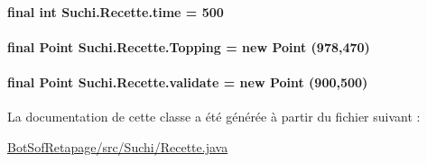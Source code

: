 \paragraph[{time}]{\setlength{\rightskip}{0pt plus 5cm}final int Suchi.\+Recette.\+time = 500\hspace{0.3cm}{\ttfamily [private]}}\label{classSuchi_1_1Recette_afcb40505dcb70462ad370a2231f74539}
\hypertarget{classSuchi_1_1Recette_a4810b2254c050209fba27757066668b3}{}
\paragraph[{Topping}]{\setlength{\rightskip}{0pt plus 5cm}final Point Suchi.\+Recette.\+Topping = new Point (978,470)\hspace{0.3cm}{\ttfamily [protected]}}\label{classSuchi_1_1Recette_a4810b2254c050209fba27757066668b3}
\hypertarget{classSuchi_1_1Recette_aff16265c9b0b819091af71f64ef84be7}{}
\paragraph[{validate}]{\setlength{\rightskip}{0pt plus 5cm}final Point Suchi.\+Recette.\+validate = new Point (900,500)\hspace{0.3cm}{\ttfamily [protected]}}\label{classSuchi_1_1Recette_aff16265c9b0b819091af71f64ef84be7}


La documentation de cette classe a été générée à partir du fichier suivant \+:\begin{DoxyCompactItemize}
\item 
\hyperlink{BotSofRetapage_2src_2Suchi_2Recette_8java}{Bot\+Sof\+Retapage/src/\+Suchi/\+Recette.\+java}\end{DoxyCompactItemize}
